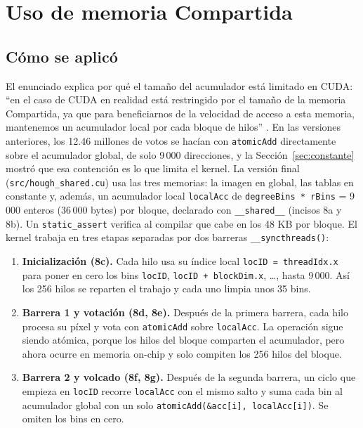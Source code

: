\section{Uso de memoria Compartida}
\label{sec:compartida}

\subsection{Cómo se aplicó}

El enunciado explica por qué el tamaño del acumulador está limitado en CUDA: \enquote{en el caso de CUDA en realidad está restringido por el tamaño de la memoria Compartida, ya que para beneficiarnos de la velocidad de acceso a esta memoria, mantenemos un acumulador local por cada bloque de hilos} \cite{enunciado}. En las versiones anteriores, los 12.46 millones de votos se hacían con \texttt{atomicAdd} directamente sobre el acumulador global, de solo 9\,000 direcciones, y la Sección~\ref{sec:constante} mostró que esa contención es lo que limita el kernel. La versión final (\texttt{src/hough\_shared.cu}) usa las tres memorias: la imagen en global, las tablas en constante y, además, un acumulador local \texttt{localAcc} de \texttt{degreeBins * rBins} = 9\,000 enteros (36\,000 bytes) por bloque, declarado con \texttt{\_\_shared\_\_} (incisos 8a y 8b). Un \texttt{static\_assert} verifica al compilar que cabe en los 48 KB por bloque. El kernel trabaja en tres etapas separadas por dos barreras \texttt{\_\_syncthreads()}:

\begin{enumerate}
  \item \textbf{Inicialización (8c).} Cada hilo usa su índice local \texttt{locID = threadIdx.x} para poner en cero los bins \texttt{locID}, \texttt{locID + blockDim.x}, \ldots, hasta 9\,000. Así los 256 hilos se reparten el trabajo y cada uno limpia unos 35 bins.
  \item \textbf{Barrera 1 y votación (8d, 8e).} Después de la primera barrera, cada hilo procesa su píxel y vota con \texttt{atomicAdd} sobre \texttt{localAcc}. La operación sigue siendo atómica, porque los hilos del bloque comparten el acumulador, pero ahora ocurre en memoria on-chip y solo compiten los 256 hilos del bloque.
  \item \textbf{Barrera 2 y volcado (8f, 8g).} Después de la segunda barrera, un ciclo que empieza en \texttt{locID} recorre \texttt{localAcc} con el mismo salto y suma cada bin al acumulador global con un solo \texttt{atomicAdd(\&acc[i], localAcc[i])}. Se omiten los bins en cero.
\end{enumerate}

